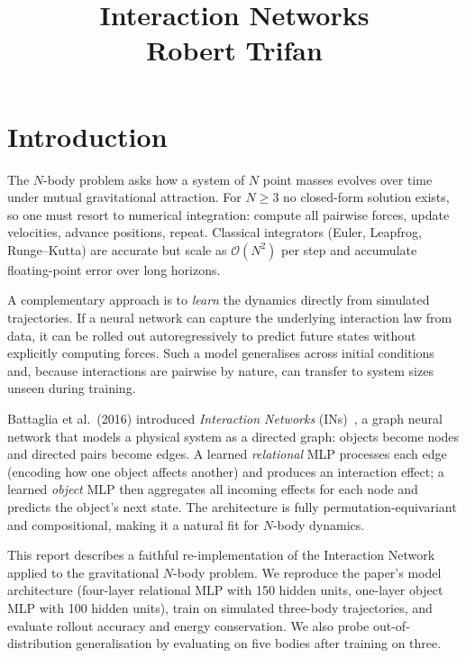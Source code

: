 \documentclass[11pt, a4paper]{article}
\title{\textbf{Interaction Networks}\\[0.4em]
       \large Robert Trifan}
\author{}
\date{}
\begin{document}
\maketitle
\thispagestyle{empty}
\vspace{-2em}


\section{Introduction}

The $N$-body problem asks how a system of $N$ point masses evolves over time under mutual gravitational attraction.
For $N \geq 3$ no closed-form solution exists, so one must resort to numerical integration: compute all pairwise
forces, update velocities, advance positions, repeat.
Classical integrators (Euler, Leapfrog, Runge--Kutta) are accurate but scale as $\mathcal{O}(N^2)$ per step and
accumulate floating-point error over long horizons.

A complementary approach is to \emph{learn} the dynamics directly from simulated trajectories.
If a neural network can capture the underlying interaction law from data, it can be rolled out autoregressively
to predict future states without explicitly computing forces.
Such a model generalises across initial conditions and, because interactions are pairwise by nature, can
transfer to system sizes unseen during training.

Battaglia et al.\ (2016) introduced \textit{Interaction Networks} (INs)~\cite{battaglia2016interactionnetworkslearningobjects}, a graph neural network that models
a physical system as a directed graph: objects become nodes and directed pairs become edges.
A learned \emph{relational} MLP processes each edge (encoding how one object affects another) and produces an
interaction effect; a learned \emph{object} MLP then aggregates all incoming effects for each node and predicts
the object's next state.
The architecture is fully permutation-equivariant and compositional, making it a natural fit for $N$-body
dynamics.

This report describes a faithful re-implementation of the Interaction Network applied to the gravitational
$N$-body problem.
We reproduce the paper's model architecture (four-layer relational MLP with 150 hidden units, one-layer object MLP
with 100 hidden units), train on simulated three-body trajectories, and evaluate rollout accuracy and energy
conservation.
We also probe out-of-distribution generalisation by evaluating on five bodies after training on three.
\end{document}
